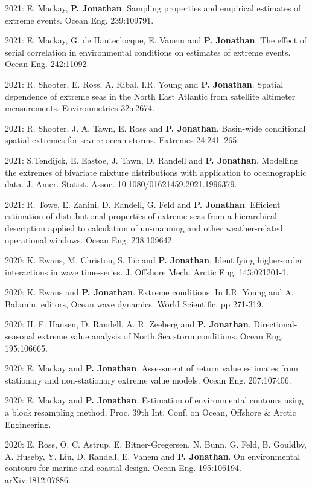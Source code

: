\documentclass[11pt,a4paper]{moderncv}
\begin{document}
2021: E. Mackay,  \textbf{P. Jonathan}. Sampling properties and empirical estimates of extreme events. Ocean Eng. 239:109791.

2021: E. Mackay, G. de Hauteclocque, E. Vanem and \textbf{P. Jonathan}. The effect of serial correlation in environmental conditions on estimates of extreme events. Ocean Eng. 242:11092.

2021: R. Shooter, E. Ross, A. Ribal, I.R. Young and \textbf{P. Jonathan}. Spatial dependence of extreme seas in the North East Atlantic from satellite altimeter measurements. Environmetrics 32:e2674.

2021: R. Shooter, J. A. Tawn, E. Ross  and \textbf{P. Jonathan}. Basin-wide conditional spatial extremes for severe ocean storms. Extremes 24:241--265.

2021: S.Tendijck, E. Eastoe, J. Tawn, D. Randell and \textbf{P. Jonathan}. Modelling the extremes of bivariate mixture distributions with application to oceanographic data. J. Amer. Statist. Assoc. 10.1080/01621459.2021.1996379.

2021: R. Towe, E. Zanini, D. Randell, G. Feld and \textbf{P. Jonathan}. Efficient estimation of distributional properties of extreme seas from a hierarchical description applied to calculation of un-manning and other weather-related operational windows. Ocean Eng. 238:109642.

2020: K. Ewans, M. Christou, S. Ilic and \textbf{P. Jonathan}. Identifying higher-order interactions in wave time-series. J. Offshore Mech. Arctic Eng. 143:021201-1.

2020: K. Ewans and \textbf{P. Jonathan}. Extreme conditions. In I.R. Young and A. Babanin, editors, Ocean wave dynamics. World Scientific, pp 271-319.

2020: H. F. Hansen, D. Randell, A. R. Zeeberg and \textbf{P. Jonathan}. Directional-seasonal extreme value analysis of North Sea storm conditions. Ocean Eng. 195:106665. 

2020: E. Mackay and \textbf{P. Jonathan}. Assessment of return value estimates from stationary and non-stationary extreme value models. Ocean Eng. 207:107406.

2020: E. Mackay and \textbf{P. Jonathan}. Estimation of environmental coutours using a block resampling method. Proc. 39th Int. Conf. on Ocean, Offshore \& Arctic Engineering.

2020: E. Ross, O. C. Astrup, E. Bitner-Gregersen, N. Bunn, G. Feld, B. Gouldby, A. Huseby, Y. Liu,  D. Randell, E. Vanem and \textbf{P. Jonathan}. On environmental contours for marine and coastal design. Ocean Eng. 195:106194. arXiv:1812.07886.
\end{document}
